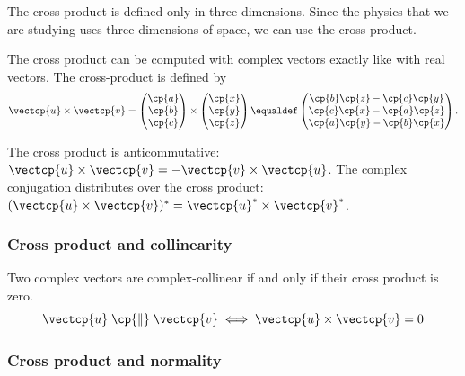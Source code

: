 \begin{refsection}
The cross product is defined only in three dimensions.
Since the physics that we are studying uses three dimensions of space, we can use the cross product.

The cross product can be computed with complex vectors exactly like with real vectors.
The cross-product is defined by
\begin{equation}
    \vectcp{u} \times \vectcp{v}
    =
    \begin{pmatrix}
        \cp{a} \\ \cp{b} \\ \cp{c}
    \end{pmatrix}
    \times
    \begin{pmatrix}
        \cp{x} \\ \cp{y} \\ \cp{z}
    \end{pmatrix}
    \equaldef
    \begin{pmatrix}
        \cp{b}\cp{z} - \cp{c}\cp{y}\\
        \cp{c}\cp{x} - \cp{a}\cp{z}\\
        \cp{a}\cp{y} - \cp{b}\cp{x}
    \end{pmatrix}
    \text{.}
\end{equation}

The cross product is anticommutative:
$\vectcp{u} \times \vectcp{v} = -\vectcp{v} \times \vectcp{u}$.
The complex conjugation distributes over the cross product:
$(\vectcp{u} \times \vectcp{v})^* = \vectcp{u}^* \times \vectcp{v}^*$.


\subsubsection{Cross product and collinearity}

    Two complex vectors are complex-collinear if and only if their cross product is zero.
\begin{equation}
    \vectcp{u} \;\cp{\parallel}\; \vectcp{v}  \iff   \vectcp{u} \times \vectcp{v} = 0
\end{equation}


\subsubsection{Cross product and normality}


\end{refsection}
